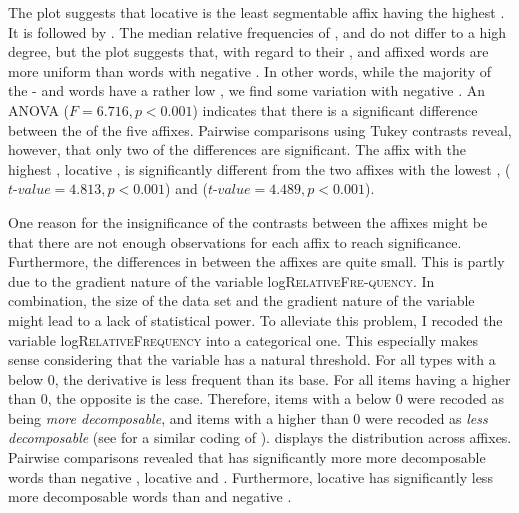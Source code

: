 The plot suggests that locative  is the least segmentable affix having the highest . It is followed by . The median relative {frequencies} of ,  and  do not differ to a high degree, but the plot suggests that, with regard to their ,  and affixed words are more uniform than words with negative . In other words, while the majority of the - and words have a rather low , we find some variation with negative . 
 An ANOVA ($F=6.716 ,p<0.001$) indicates that there is a significant difference between the  of the five affixes. Pairwise comparisons using Tukey contrasts reveal, however, that only two of the differences are significant. The affix with the highest , locative , is significantly different from the two affixes with the lowest ,  ($t$-$value=4.813, p<0.001$)  and  ($t$-$value=4.489, p<0.001$). 

            

One reason for the insignificance of the contrasts between the affixes might be that there are not enough observations for each affix to reach significance. Furthermore, the differences in  between the affixes are quite small. This is partly due to the gradient nature of the variable log\textsc{RelativeFre-quency}. In combination, the size of the data set and the gradient nature of the variable might lead to a lack of statistical power. 
To alleviate this problem, I recoded the variable log\textsc{RelativeFrequency} into a categorical one. This especially makes sense considering that the variable has a natural threshold. For all types with a  below 0, the derivative is less frequent than its base. For all items having a  higher than 0, the opposite is the case. Therefore, items with a  below 0 were recoded as being \textit{more decomposable}, and items with a  higher than 0 were recoded as \textit{less decomposable }(see \citealt{Hay.2001,Collie.2008} for a similar coding of ).  displays the distribution across affixes.
Pairwise comparisons revealed that  has significantly more {more decomposable} words  than negative , locative  and . Furthermore, locative  has significantly less {more decomposable} words than  and negative . 

